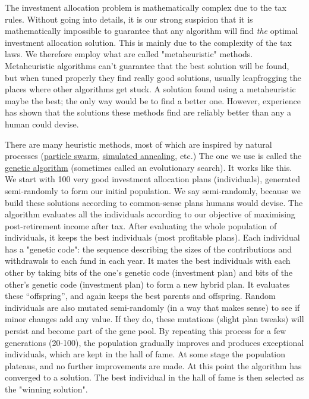 \documentclass[a4paper, justified]{tufte-handout}
\begin{document}
The investment allocation problem is mathematically complex due to the tax rules. Without going into details, it is our strong suspicion that it is mathematically impossible to guarantee that any algorithm will find \textit{the} optimal investment allocation solution. This is mainly due to the complexity of the tax laws. We therefore employ what are called "metaheuristic" methods. Metaheuristic algorithms can't guarantee that the best solution will be found, but when tuned properly they find really good solutions, usually leapfrogging the places where other algorithms get stuck. A solution found using a metaheuristic maybe the best; the only way would be to find a better one. However, experience has shown that the solutions these methods find are reliably better than any a human could devise.

There are many heuristic methods, most of which are inspired by natural processes (\href{https://en.wikipedia.org/wiki/Particle_swarm_optimization}{particle swarm}, \href{https://en.wikipedia.org/wiki/Simulated_annealing}{simulated annealing}, etc.) The one we use is called the \href{https://en.wikipedia.org/wiki/Genetic_algorithm}{genetic algorithm} (sometimes called an evolutionary search). It works like this. We start with 100 very good investment allocation plans (individuals), generated semi-randomly to form our initial population. We say semi-randomly, because we build these solutions according to common-sense plans humans would devise. The algorithm evaluates all the individuals according to our objective of maximising post-retirement income after tax. After evaluating the whole population of individuals, it keeps the best individuals (most profitable plans). Each individual has a "genetic code": the sequence describing the sizes of the contributions and withdrawals to each fund in each year. It mates the best individuals with each other by taking bits of the one's genetic code (investment plan) and bits of the other's genetic code (investment plan) to form a new hybrid plan. It evaluates these ``offspring'', and again keeps the best parents and offspring. Random individuals are also mutated semi-randomly (in a way that makes sense) to see if minor changes add any value. If they do, these mutations (slight plan tweaks) will persist and become part of the gene pool. By repeating this process for a few generations (20-100), the population gradually improves and produces exceptional individuals, which are kept in the hall of fame. At some stage the population plateaus, and no further improvements are made. At this point the algorithm has converged to a solution. The best individual in the hall of fame is then selected as the "winning solution".
\end{document}
